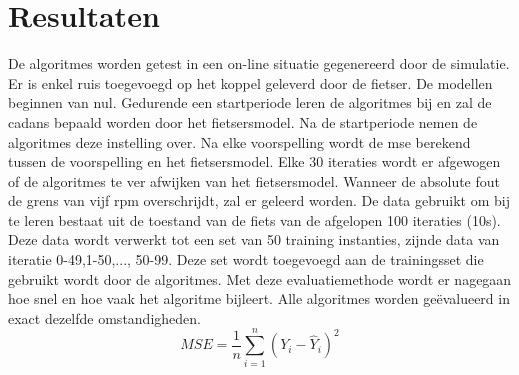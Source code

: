 \chapter{Resultaten}
De algoritmes worden getest in een on-line situatie gegenereerd door de simulatie. Er is enkel ruis toegevoegd op het koppel geleverd door de fietser. De modellen beginnen van nul. Gedurende een startperiode leren de algoritmes bij en zal de cadans bepaald worden door het fietsersmodel. Na de startperiode nemen de algoritmes deze instelling over. Na elke voorspelling wordt de \gls{mse} berekend tussen de voorspelling en het fietsersmodel. Elke 30 iteraties wordt er afgewogen of de algoritmes te ver afwijken van het fietsersmodel. Wanneer de absolute fout de grens van vijf rpm overschrijdt, zal er geleerd worden. De data gebruikt om bij te leren bestaat uit de toestand van de fiets van de afgelopen 100 iteraties (10s). Deze data wordt verwerkt tot een set van 50 training instanties, zijnde data van iteratie 0-49,1-50,..., 50-99. Deze set wordt toegevoegd aan de trainingsset die gebruikt wordt door de algoritmes. Met deze evaluatiemethode wordt er nagegaan hoe snel en hoe vaak het algoritme bijleert. Alle algoritmes worden geëvalueerd in exact dezelfde omstandigheden.
\[MSE = \frac{1}{n} \sum_{i=1}^{n} (Y_i-\hat{Y}_i)^2\]

